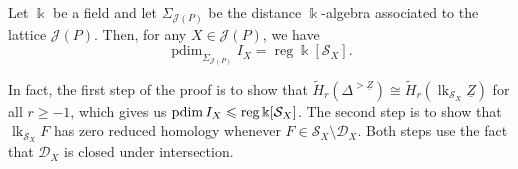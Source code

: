 \documentclass[a4paper,leqno]{amsart}
\begin{document}


\begin{thm}\label{thm:pdim=reg}
Let $\Bbbk$ be a field and let $\Sigma_{\mathcal{J}(P)}$ be the distance $\Bbbk$-algebra associated to the lattice $\mathcal{J}(P)$. Then, for any $X\in\mathcal{J}(P)$, we have
\[
\operatorname{pdim}_{\Sigma_{\mathcal{J}(P)}} I_X=\operatorname{reg}\Bbbk[\mathcal S_X].
\]
\end{thm}

In fact, the first step of the proof is to show that $\widetilde H_r(\Delta^{>\underline{Z}})\cong\widetilde H_r(\operatorname{lk}_{\mathcal S_X}\underline{Z})$ for all $r\ge -1$, which gives us $\operatorname{pdim} I_X\leqslant \operatorname{reg} \Bbbk[\mathcal{S}_X]$. The second step is to show that $\operatorname{lk}_{\mathcal S_X}F$ has zero reduced homology whenever $F\in\mathcal S_X\setminus\mathcal D_X$. Both steps use the fact that $\mathcal D_X$ is closed under intersection.
\end{document}
